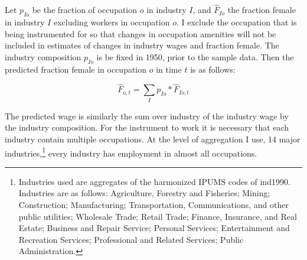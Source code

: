\documentclass[12pt]{article}
\begin{document}

Let $p_{Io}$ be the fraction of occupation $o$ in industry $I$, and $\hat{F}_{Io}$ the fraction female in industry $I$ excluding workers in occupation $o$. I exclude the occupation that is being instrumented for so that changes in occupation amenities will not be included in estimates of changes in industry wages and fraction female. The industry composition $p_{Io}$ is be fixed in 1950, prior to the sample data. Then the predicted fraction female in occupation $o$ in time $t$ is as follows:

$$\hat{F}_{o,t} = \sum_I  p_{Io}*\hat{F}_{Io,t} $$

The predicted wage is similarly the sum over industry of the industry wage by the industry composition. For the instrument to work it is necessary that each industry contain multiple occupations. At the level of aggregation I use, 14 major industries,\footnote{Industries used are aggregates of the harmonized IPUMS codes of ind1990. Industries are as follows: Agriculture, Forestry and Fisheries; Mining; Construction; Manufacturing; Transportation, Communications, and other public utilities; Wholesale Trade; Retail Trade; Finance, Insurance, and Real Estate; Business and Repair Service; Personal Services; Entertainment and Recreation Services; Professional and Related Services; Public Administration.} every industry has employment in almost all occupations.



\end{document}
